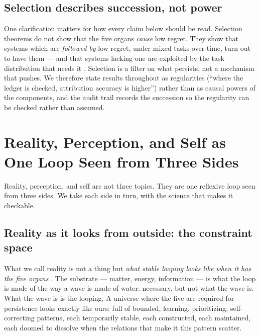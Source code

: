 \documentclass[11pt]{article}
\begin{document}
\subsection{Selection describes succession, not power}
\label{sec:occasionalism}

One clarification matters for how every claim below should be read. Selection
theorems do not show that the five organs \emph{cause} low regret. They show
that systems which are \emph{followed by} low regret, under mixed tasks over
time, turn out to have them --- and that systems lacking one are exploited by
the task distribution that needs it \citep{nayebi2026}. Selection is a filter
on what persists, not a mechanism that pushes. We therefore state results
throughout as regularities (``where the ledger is checked, attribution accuracy
is higher'') rather than as causal powers of the components, and the audit
trail records the succession so the regularity can be checked rather than
assumed.

\section{Reality, Perception, and Self as One Loop Seen from Three Sides}
\label{sec:three-sides}

Reality, perception, and self are not three topics. They are one reflexive loop seen from three sides. We take each side in turn, with the science that makes it checkable.

\subsection{Reality as it looks from outside: the constraint space}

What we call reality is not a thing but \emph{what stable looping looks like when it has the five organs} \citep{maturana1980,tononi2014}. The substrate --- matter, energy, information --- is what the loop is made of the way a wave is made of water: necessary, but not what the wave is. What the wave is is the looping. A universe where the five are required for persistence looks exactly like ours: full of bounded, learning, prioritizing, self-correcting patterns, each temporarily stable, each constructed, each maintained, each doomed to dissolve when the relations that make it this pattern scatter.
\end{document}
